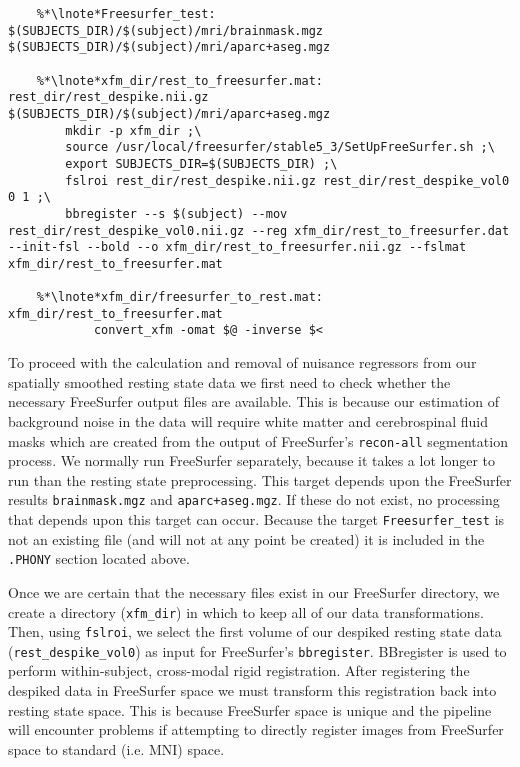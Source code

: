 \begin{lstlisting}
	%*\lnote*Freesurfer_test: $(SUBJECTS_DIR)/$(subject)/mri/brainmask.mgz $(SUBJECTS_DIR)/$(subject)/mri/aparc+aseg.mgz

	%*\lnote*xfm_dir/rest_to_freesurfer.mat: rest_dir/rest_despike.nii.gz $(SUBJECTS_DIR)/$(subject)/mri/aparc+aseg.mgz
		mkdir -p xfm_dir ;\
		source /usr/local/freesurfer/stable5_3/SetUpFreeSurfer.sh ;\
		export SUBJECTS_DIR=$(SUBJECTS_DIR) ;\
		fslroi rest_dir/rest_despike.nii.gz rest_dir/rest_despike_vol0 0 1 ;\
		bbregister --s $(subject) --mov rest_dir/rest_despike_vol0.nii.gz --reg xfm_dir/rest_to_freesurfer.dat --init-fsl --bold --o xfm_dir/rest_to_freesurfer.nii.gz --fslmat xfm_dir/rest_to_freesurfer.mat

	%*\lnote*xfm_dir/freesurfer_to_rest.mat: xfm_dir/rest_to_freesurfer.mat
			convert_xfm -omat $@ -inverse $<
\end{lstlisting}

\lnum{11} To proceed with the calculation and removal of nuisance regressors from our spatially smoothed resting state data we first need to check whether the necessary FreeSurfer output files are available. This is because our estimation of background noise in the data will require white matter and cerebrospinal fluid masks which are created from the output of FreeSurfer's \texttt{recon-all} segmentation process. We normally run FreeSurfer separately, because it takes a lot longer to run than the resting state preprocessing. This target depends upon the FreeSurfer results \texttt{brainmask.mgz} and \texttt{aparc+aseg.mgz}. If these do not exist, no processing that depends upon this target can occur. Because the target \texttt{Freesurfer_test} is not an existing file (and will not at any point be created) it is included in the \texttt{.PHONY} section located above.

\lnum{12} Once we are certain that the necessary files exist in our FreeSurfer directory, we create a directory (\texttt{xfm_dir}) in which to keep all of our data transformations. Then, using \texttt{fslroi}, we select the first volume of our despiked resting state data (\texttt{rest_despike_vol0}) as input for FreeSurfer's \texttt{bbregister}. BBregister is used to perform within-subject, cross-modal rigid registration.  After registering the despiked data in FreeSurfer space we must transform this registration back into resting state space. This is because FreeSurfer space is unique and the pipeline will encounter problems if attempting to directly register images from FreeSurfer space to standard (i.e. MNI) space.

